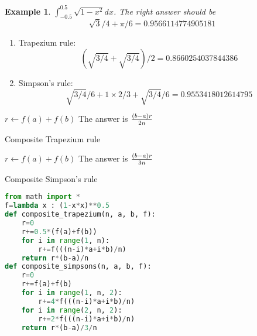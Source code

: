 \documentclass[20pt]{article} %
\theoremstyle{break}
\newtheorem{exa}[definition]{Example}
\begin{document}
\newpage

\begin{exa}$\int_{-0.5}^{0.5}\sqrt{1-x^2}dx$. The right answer should be
  \[\sqrt{3}/4+\pi/6=0.9566114774905181\]
\end{exa}

\begin{enumerate}
  \item Trapezium rule:
    \[(\sqrt{3/4}+\sqrt{3/4})/2=0.8660254037844386\]
  \item Simpson's rule:
    \[\sqrt{3/4}/6+1\times 2/3+\sqrt{3/4}/6=0.9553418012614795\]
  \end{enumerate}

 \newpage
{}
\LinesNumbered
 \begin{algorithm}[H]
 $r\leftarrow f(a)+f(b)$\;  
 The answer is ${(b-a)r\over 2n}$\;
 \caption{Composite Trapezium rule}
\end{algorithm}


\LinesNumbered
 \begin{algorithm}[H]
 $r\leftarrow f(a)+f(b)$\;  
 The answer is ${(b-a)r\over 3n}$\;
 \caption{Composite Simpson's rule}
\end{algorithm}


 \newpage
 
\begin{lstlisting}[language=Python]
from math import *
f=lambda x : (1-x*x)**0.5
def composite_trapezium(n, a, b, f):
    r=0
    r+=0.5*(f(a)+f(b))
    for i in range(1, n):
        r+=f(((n-i)*a+i*b)/n)
    return r*(b-a)/n
def composite_simpsons(n, a, b, f):
    r=0
    r+=f(a)+f(b)
    for i in range(1, n, 2):
        r+=4*f(((n-i)*a+i*b)/n)
    for i in range(2, n, 2):
        r+=2*f(((n-i)*a+i*b)/n)
    return r*(b-a)/3/n
\end{lstlisting}

\newpage
\end{document}
